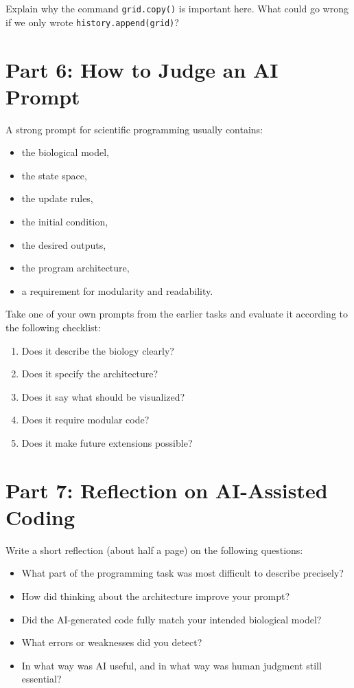 \documentclass[paper=letter, fontsize=12pt]{article}
\numberwithin{equation}{section}
\begin{document}
\begin{taskbox}
Explain why the command \texttt{grid.copy()} is important here. What could go wrong if we only wrote \texttt{history.append(grid)}?
\end{taskbox}

\section*{Part 6: How to Judge an AI Prompt}

A strong prompt for scientific programming usually contains:
\begin{itemize}
\item the biological model,
\item the state space,
\item the update rules,
\item the initial condition,
\item the desired outputs,
\item the program architecture,
\item a requirement for modularity and readability.
\end{itemize}

\begin{taskbox}
Take one of your own prompts from the earlier tasks and evaluate it according to the following checklist:
\begin{enumerate}[label=\arabic*.]
\item Does it describe the biology clearly?
\item Does it specify the architecture?
\item Does it say what should be visualized?
\item Does it require modular code?
\item Does it make future extensions possible?
\end{enumerate}
\end{taskbox}

\section*{Part 7: Reflection on AI-Assisted Coding}

\begin{taskbox}
Write a short reflection (about half a page) on the following questions:
\begin{itemize}
\item What part of the programming task was most difficult to describe precisely?
\item How did thinking about the architecture improve your prompt?
\item Did the AI-generated code fully match your intended biological model?
\item What errors or weaknesses did you detect?
\item In what way was AI useful, and in what way was human judgment still essential?
\end{itemize}
\end{taskbox}
\end{document}
